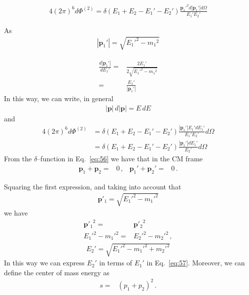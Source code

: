 \begin{align}
  4(2\pi)^6d\Phi^{(2)}=\delta(E_1+E_2-E_1'-E_2')
  \frac{{\mathbf{p}_1'}^2d|\mathbf{p}_1'|d\Omega}{E_{1}'E_{2}'}
\end{align}

As
\begin{align}
  |\mathbf{p}_1'|=\sqrt{{E_1'}^2-{m_1}^2}
\end{align}

\begin{align}
  \frac{d|\mathbf{p}_1'|}{dE_1'}=&\frac{2E_1'}{2\sqrt{{E_1'}^2-{m_1}^2}}\nonumber\\
  =&\frac{E_1'}{|\mathbf{p}_1'|}
\end{align}
In this way, we can write, in general
\begin{align}
 |\mathbf{p}|\, d|\mathbf{p}|=E\,dE
\end{align}
and
\begin{align}
\label{eq:57}
 4(2\pi)^6 d\Phi^{(2)}&=\delta(E_1+E_2-E_1'-E_2')
\frac{|\mathbf{p}_1'|E_1'dE_1'}{E_{1}'E_{2}'}d\Omega\nonumber\\
  &=\delta(E_1+E_2-E_1'-E_2')
\frac{|\mathbf{p}_1'|dE_1'}{E_{2}'}d\Omega
\end{align}
From the $\delta$--function in Eq.~\eqref{eq:56} we have that in the CM frame
\begin{align}
  \mathbf{p}_1+\mathbf{p}_2=&0\,,&\mathbf{p}_1'+\mathbf{p}_2'=&0\,. 
\end{align}

Squaring the first expression, and taking into account that
\begin{align}
  \label{eq:58}
  {\mathbf{p}'_1}= \sqrt{{E_1'}^2-{m_1'}^2}
\end{align}
we have
\begin{align}
  {\mathbf{p}'_1}^2=&{\mathbf{p}'_2}^2\nonumber\\
  {E_1'}^2-{m_1'}^2=&  {E_2'}^2-{m_2'}^2\,,
\end{align}
\begin{align}
\label{eq:59}
  E_2'=\sqrt{{E_1'}^2-{m_1'}^2+{m_2'}^2}
\end{align}
In this way we can express $E_2'$ in terms of $E_1'$ in Eq.~\eqref{eq:57}.
Moreover, we can define the center of mass energy as
\begin{align}
\label{eq:smv}
  s=&\left( p_1+p_2 \right)^2\,.
\end{align}

